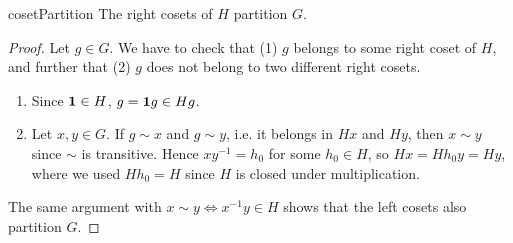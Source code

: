 \begin{proposition}{}{cosetPartition}
  The right cosets of $H$ partition $G$.
  \begin{proof}
    Let $g\in G$. We have to check that (1) $g$ belongs to some right coset
    of $H$, and further that (2) $g$ does not belong to two different right
    cosets.
    \begin{enumerate}
      \item Since ${\mathbf 1}\in H$, $g={\mathbf 1} g\in Hg$.
      \item Let $x,y\in G$. If $g\sim x$ and $g\sim y$, i.e. it belongs in
            $Hx$ and $Hy$, then $x\sim y$ since $\sim$ is transitive. Hence
            $xy^{-1}=h_0$ for some $h_0\in H$, so $Hx=Hh_0y=Hy$, where we
            used $Hh_0=H$ since $H$ is closed under multiplication.
    \end{enumerate}
    The same argument with $x\sim y\Leftrightarrow x^{-1}y\in H$ shows that
    the left cosets also partition $G$.
  \end{proof}
\end{proposition}

